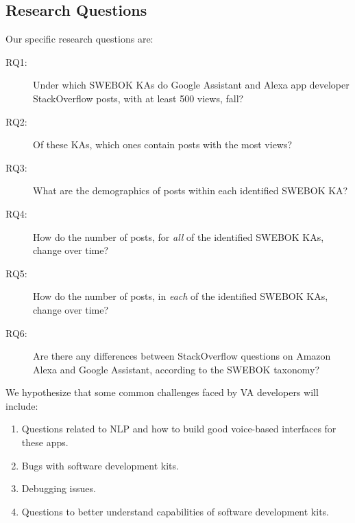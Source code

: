 \documentclass{sigchi}
\begin{document}

\subsection{Research Questions}
Our specific research questions are:
\begin{description}
\item [RQ1:]Under which SWEBOK KAs do Google Assistant and Alexa app developer StackOverflow posts, with at least 500 views, fall?
\item [RQ2:]Of these KAs, which ones contain posts with the most views?
\item [RQ3:]What are the demographics of posts within each identified SWEBOK KA?
\item [RQ4:]How do the number of posts, for \textit{all} of the identified SWEBOK KAs, change over time?
\item [RQ5:]How do the number of posts, in \textit{each} of the identified SWEBOK KAs, change over time?
\item [RQ6:]Are there any differences between StackOverflow questions on Amazon Alexa and Google Assistant, according to the SWEBOK taxonomy?
\end{description}

We hypothesize that some common challenges faced by VA developers will include:
\begin{enumerate}
\item Questions related to NLP and how to build good voice-based interfaces for these apps.
\item Bugs with software development kits.
\item Debugging issues.
\item Questions to better understand capabilities of software development kits. 
\end{enumerate}

\end{document}
